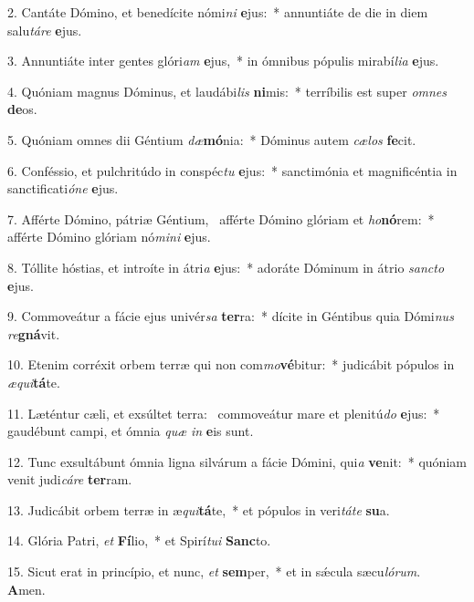 2. Cantáte Dómino, et benedícite nómi\textit{ni} \textbf{e}jus:~*  annuntiáte de die in diem salu\textit{tá}\textit{re} \textbf{e}jus.\

3. Annuntiáte inter gentes glóri\textit{am} \textbf{e}jus,~*  in ómnibus pópulis mirabí\textit{li}\textit{a} \textbf{e}jus.\

4. Quóniam magnus Dóminus, et laudábi\textit{lis} \textbf{ni}mis:~*  terríbilis est super \textit{om}\textit{nes} \textbf{de}os.\

5. Quóniam omnes dii Géntium \textit{dæ}\textbf{mó}nia:~*  Dóminus autem \textit{cæ}\textit{los} \textbf{fe}cit.\

6. Conféssio, et pulchritúdo in conspéc\textit{tu} \textbf{e}jus:~*  sanctimónia et magnificéntia in sanctificati\textit{ó}\textit{ne} \textbf{e}jus.\

7. Afférte Dómino, pátriæ Géntium, \dag\  afférte Dómino glóriam et \textit{ho}\textbf{nó}rem:~*  afférte Dómino glóriam nó\textit{mi}\textit{ni} \textbf{e}jus.\

8. Tóllite hóstias, et introíte in átri\textit{a} \textbf{e}jus:~*  adoráte Dóminum in átrio \textit{sanc}\textit{to} \textbf{e}jus.\

9. Commoveátur a fácie ejus univér\textit{sa} \textbf{ter}ra:~*  dícite in Géntibus quia Dómi\textit{nus} \textit{re}\textbf{gná}vit.\

10. Etenim corréxit orbem terræ qui non com\textit{mo}\textbf{vé}bitur:~*  judicábit pópulos in \textit{æ}\textit{qui}\textbf{tá}te.\

11. Læténtur cæli, et exsúltet terra: \dag\  commoveátur mare et plenitú\textit{do} \textbf{e}jus:~*  gaudébunt campi, et ómnia \textit{quæ} \textit{in} \textbf{e}is sunt.\

12. Tunc exsultábunt ómnia ligna silvárum a fácie Dómini, qui\textit{a} \textbf{ve}nit:~*  quóniam venit judi\textit{cá}\textit{re} \textbf{ter}ram.\

13. Judicábit orbem terræ in æ\textit{qui}\textbf{tá}te,~*  et pópulos in veri\textit{tá}\textit{te} \textbf{su}a.\

14. Glória Patri, \textit{et} \textbf{Fí}lio,~*  et Spirí\textit{tu}\textit{i} \textbf{Sanc}to.\

15. Sicut erat in princípio, et nunc, \textit{et} \textbf{sem}per,~*  et in sǽcula sæcu\textit{ló}\textit{rum}. \textbf{A}men.\

